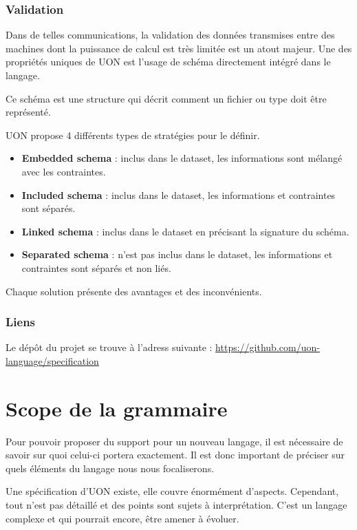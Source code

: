 \documentclass[
    iict, %
    il, %
]{heig-tb}
\begin{document}
\subsection{Validation}
Dans de telles communications, la validation des données transmises entre des machines dont la puissance de calcul est très limitée est un atout majeur.
Une des propriétés uniques de UON est l'usage de schéma directement intégré dans le langage.

Ce schéma est une structure qui décrit comment un fichier ou type doit être représenté.

UON propose 4 différents types de stratégies pour le définir.

\begin{itemize}
    \item \textbf{Embedded schema} : inclus dans le dataset, les informations sont mélangé avec les contraintes.
    \item \textbf{Included schema} : inclus dans le dataset, les informations et contraintes sont séparés.
    \item \textbf{Linked schema} : inclus dans le dataset en précisant la signature du schéma.
    \item \textbf{Separated schema} : n'est pas inclus dans le dataset, les informations et contraintes sont séparés et non liés.
\end{itemize}

Chaque solution présente des avantages et des inconvénients.

\subsection{Liens}
Le dépôt du projet se trouve à l'adress suivante : \url{https://github.com/uon-language/specification}

\chapter{Scope de la grammaire}\label{grammar scope}
Pour pouvoir proposer du support pour un nouveau langage, il est nécessaire de savoir sur quoi celui-ci portera exactement.
Il est donc important de préciser sur quels éléments du langage nous nous focaliserons.

Une spécification d'UON existe, elle couvre énormément d'aspects. Cependant, tout n'est pas détaillé et des points sont sujets à interprétation.
C'est un langage complexe et qui pourrait encore, être amener à évoluer.
\end{document}
